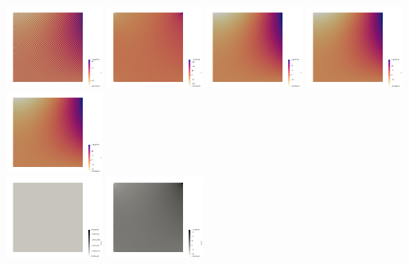 \begin{center}
\includegraphics[width=3.2cm]{python_codes/fieldstone_115/results/buha06/p0}
\includegraphics[width=3.2cm]{python_codes/fieldstone_115/results/buha06/p1}
\includegraphics[width=3.2cm]{python_codes/fieldstone_115/results/buha06/p2}
\includegraphics[width=3.2cm]{python_codes/fieldstone_115/results/buha06/p3}
\includegraphics[width=3.2cm]{python_codes/fieldstone_115/results/buha06/p4}\\
\includegraphics[width=3.2cm]{python_codes/fieldstone_115/results/buha06/divv0}
\includegraphics[width=3.2cm]{python_codes/fieldstone_115/results/buha06/divv1}

\end{center}
